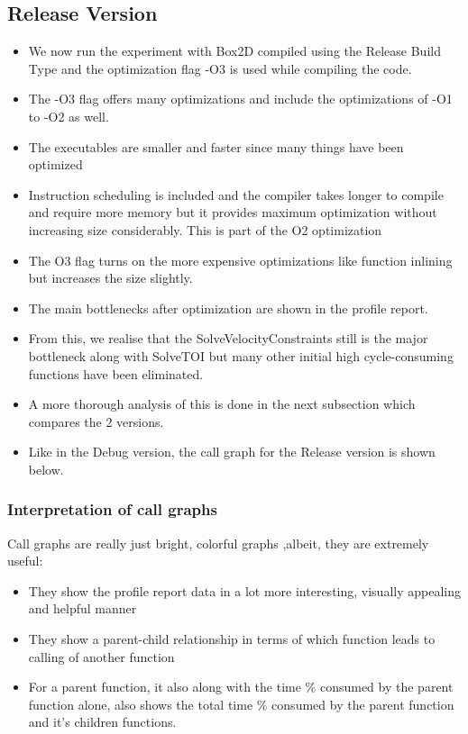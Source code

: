 \documentclass[11pt]{article}
\begin{document}
	\subsection{Release Version}
		\begin{itemize}
		\item We now run the experiment with Box2D compiled using the Release Build Type and the optimization flag -O3 is used while compiling the code. 
		\item The -O3 flag offers many optimizations and include the optimizations of -O1 to -O2 as well. 
		
		\item The executables are smaller and faster since many things have been optimized
	
		\item Instruction scheduling is included and the compiler takes longer to compile and require more memory but it provides maximum optimization without increasing size considerably. This is part of the O2 optimization
		\item The O3 flag turns on the more expensive optimizations like function inlining but increases the size slightly.
		
		\item The main bottlenecks after optimization are shown in the profile report.
		\item From this, we realise that the SolveVelocityConstraints still is the major bottleneck along with SolveTOI but many other initial high cycle-consuming functions have been eliminated. 
		\item A more thorough analysis of this is done in the next subsection which compares the 2 versions.
		\item Like in the Debug version, the call graph for the Release version is shown below.
		\end{itemize}
	
	\subsubsection{Interpretation of call graphs}
		Call graphs are really just bright, colorful graphs ,albeit, they are extremely useful:
			\begin{itemize}
				\item They show the profile report data in a lot more interesting, visually appealing and helpful manner
				\item They show a parent-child relationship in terms of which function leads to calling of another function
				\item For a parent function, it also along with the time \% consumed by the parent function alone, also shows the total time \% consumed by the parent function and it's children functions.
			\end{itemize}
\end{document}
